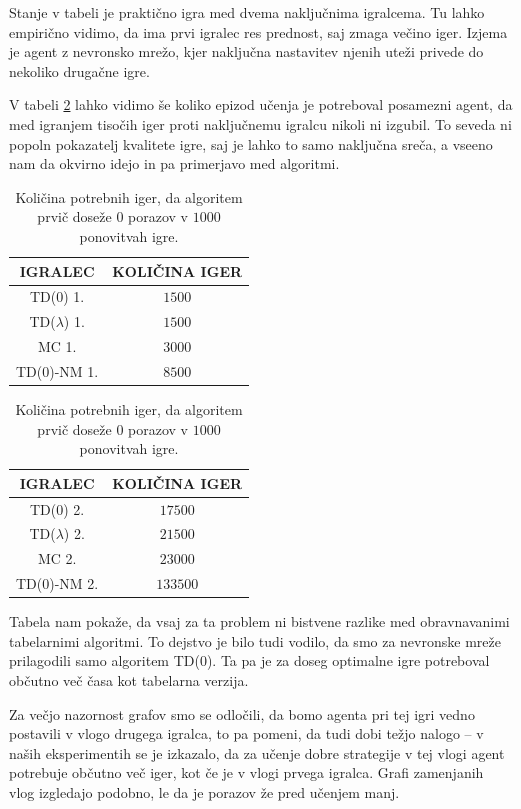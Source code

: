 \documentclass[12pt,a4paper]{amsart}
\theoremstyle{definition} %
\theoremstyle{plain} %
\begin{document}
Stanje v tabeli je praktično igra med dvema naključnima igralcema. Tu lahko empirično vidimo, da ima 
prvi igralec res prednost, saj zmaga večino iger. Izjema je agent z nevronsko mrežo, kjer naključna 
nastavitev njenih uteži privede do nekoliko drugačne igre.

V tabeli \ref{tab:2} lahko vidimo še koliko epizod učenja je potreboval posamezni agent, da med igranjem 
tisočih iger proti naključnemu igralcu nikoli ni izgubil. To seveda ni popoln pokazatelj 
kvalitete igre, saj je lahko to samo naključna sreča, a vseeno nam da okvirno idejo in pa primerjavo 
med algoritmi. 

\begin{center}
    \begin{table}[H]
        \begin{tabular}{| c | c |}
            \hline
            IGRALEC & KOLIČINA IGER\\
            \hline
            TD($0$) 1. & $1500$\\
            TD($\lambda$) 1. & $1500$\\
            MC 1. & $3000$\\
            TD($0$)-NM 1. & $8500$\\
            \hline
    \end{tabular}
    \quad
    \begin{tabular}{| c | c |}
        \hline
        IGRALEC & KOLIČINA IGER\\
        \hline
        TD($0$) 2. & $17500$\\
        TD($\lambda$) 2. & $21500$\\
        MC 2. & $23000$\\
        TD($0$)-NM 2. & $133500$\\
        \hline
    \end{tabular}
    \caption{Količina potrebnih iger, da algoritem prvič doseže $0$ porazov v $1000$ ponovitvah igre.}
    \label{tab:2}
    \end{table}
\end{center}

Tabela nam pokaže, da vsaj za ta problem ni bistvene razlike med obravnavanimi tabelarnimi algoritmi. 
To dejstvo je bilo tudi vodilo, da smo za nevronske mreže prilagodili samo algoritem TD($0$). Ta pa 
je za doseg optimalne igre potreboval občutno več časa kot tabelarna verzija.

Za večjo nazornost grafov smo se odločili, da bomo agenta pri tej igri vedno postavili v vlogo 
drugega igralca, to pa pomeni, da tudi dobi težjo nalogo -- v naših eksperimentih se je izkazalo, 
da za učenje dobre strategije v tej vlogi agent potrebuje občutno več iger, kot če je v vlogi 
prvega igralca. Grafi zamenjanih vlog izgledajo podobno, le da je porazov že pred učenjem manj.
\end{document}

